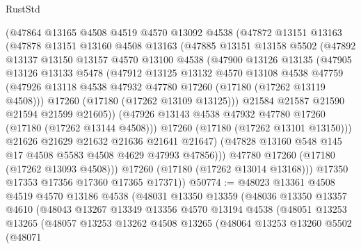 \begin{lexlean}{RustStd}
\begin{coremodule}
{\begin{coremodule}
{{{{{{{{{{{{{{{{{{{{{{{{{{{{{{{{{{{{{{{{{{{{{{{{{{{{{{{          (@47864
            @13165
            @4508
            @4519
            @4570
            @13092
            @4538
            (@47872
              @13151
              @13163
              (@47878
                @13151
                @13160
                @4508
                @13163
                (@47885
                  @13151
                  @13158
                  @5502
                  (@47892
                    @13137
                    @13150
                    @13157
                    @4570
                    @13100
                    @4538
                    (@47900
                      @13126
                      @13135
                      (@47905
                        @13126
                        @13133
                        @5478
                        (@47912
                          @13125
                          @13132
                          @4570
                          @13108
                          @4538
                          @47759
                          (@47926 @13118 @4538 @47932 @47780 @17260 (@17180 (@17262 @13119 @4508)))
                          @17260
                          (@17180 (@17262 @13109 @13125)))
                        @21584
                        @21587
                        @21590
                        @21594
                        @21599
                        @21605))
                    (@47926 @13143 @4538 @47932 @47780 @17260 (@17180 (@17262 @13144 @4508)))
                    @17260
                    (@17180 (@17262 @13101 @13150)))
                  @21626
                  @21629
                  @21632
                  @21636
                  @21641
                  @21647)
                (@47828 @13160 @548 @145 @17 @4508 @5583 @4508 @4629 @47993 @47856)))
            @47780
            @17260
            (@17180 (@17262 @13093 @4508)))
          @17260
          (@17180 (@17262 @13014 @13168)))
        @17350
        @17353
        @17356
        @17360
        @17365
        @17371))
@50774 := @48023
    @13361
    @4508
    @4519
    @4570
    @13186
    @4538
    (@48031
      @13350
      @13359
      (@48036
        @13350
        @13357
        @4610
        (@48043
          @13267
          @13349
          @13356
          @4570
          @13194
          @4538
          (@48051
            @13253
            @13265
            (@48057
              @13253
              @13262
              @4508
              @13265
              (@48064
                @13253
                @13260
                @5502
                (@48071
}}}}}}}}}}}}}}}}}}}}}}}}}}}}}}}}}}}}}}}}}}}}}}}}}}}}}}}
\end{coremodule}}
\end{coremodule}
\end{lexlean}
